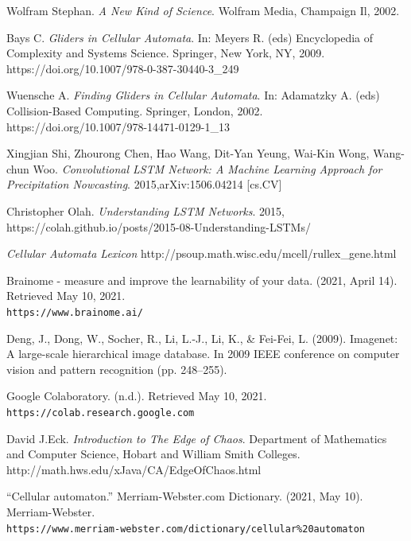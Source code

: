 \documentclass[12pt]{article}
\numberwithin{figure}{section} %
\begin{document}
\newpage

\begin{thebibliography}{9}
Wolfram Stephan.
\textit{A New Kind of Science}. 
Wolfram Media, Champaign Il, 2002. 

Bays C.
\textit{Gliders in Cellular Automata}. 
In: Meyers R. (eds) Encyclopedia of Complexity and Systems Science. Springer, New York, NY, 2009.
https://doi.org/10.1007/978-0-387-30440-3\_249

Wuensche A.
\textit{Finding Gliders in Cellular Automata}. 
In: Adamatzky A. (eds) Collision-Based Computing. Springer, London, 2002. 
https://doi.org/10.1007/978-14471-0129-1\_13

Xingjian Shi, Zhourong Chen, Hao Wang, Dit-Yan Yeung, Wai-Kin Wong, Wang-chun Woo. 
\textit{Convolutional LSTM Network: A Machine Learning Approach for Precipitation Nowcasting}. 
2015,arXiv:1506.04214 [cs.CV]

Christopher Olah.
\textit{Understanding LSTM Networks}. 
2015, https://colah.github.io/posts/2015-08-Understanding-LSTMs/

\textit{Cellular Automata Lexicon}
http://psoup.math.wisc.edu/mcell/rullex\_gene.html

Brainome - measure and improve the learnability of your data. (2021, April 14). Retrieved May 10, 2021. 
\\\texttt{https://www.brainome.ai/}

Deng, J., Dong, W., Socher, R., Li, L.-J., Li, K., \& Fei-Fei, L. (2009). Imagenet: A large-scale hierarchical image database. In 2009 IEEE conference on computer vision and pattern recognition (pp. 248–255).

Google Colaboratory. (n.d.). Retrieved May 10, 2021. 
\\\texttt{https://colab.research.google.com}

David J.Eck.
\textit{Introduction to The Edge of Chaos}.
Department of Mathematics and Computer Science, Hobart and William Smith Colleges. 
http://math.hws.edu/xJava/CA/EdgeOfChaos.html
 
“Cellular automaton.” Merriam-Webster.com Dictionary. (2021, May 10). Merriam-Webster. 
\\\texttt{https://www.merriam-webster.com/dictionary/cellular\%20automaton}


\end{thebibliography}
\end{document}
